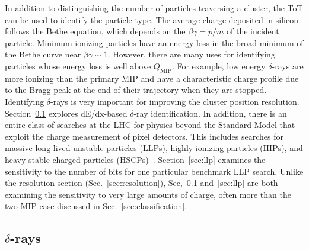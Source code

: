 \documentclass[12pt]{article}
\begin{document}
In addition to distinguishing the number of particles traversing a cluster, the ToT can be used to identify the particle type.  The average charge deposited in silicon follows the Bethe equation, which depends on the $\beta\gamma=p/m$ of the incident particle.  Minimum ionizing particles have an energy loss in the broad minimum of the Bethe curve near $\beta\gamma\sim 1$.  However, there are many uses for identifying particles whose energy loss is well above $Q_\text{MIP}$.  For example, low energy $\delta$-rays are more ionizing than the primary MIP and have a characteristic charge profile due to the Bragg peak at the end of their trajectory when they are stopped.    Identifying $\delta$-rays is very important for improving the cluster position resolution.  Section~\ref{sec:deltas} explores dE/dx-based $\delta$-ray identification.  In addition, there is an entire class of searches at the LHC for physics beyond the Standard Model that exploit the charge measurement of pixel detectors.  This includes searches for massive long lived unstable particles (LLPs), highly ionizing particles (HIPs), and heavy stable charged particles (HSCPs)~\cite{Aaboud:2016dgf,Khachatryan:2016sfv,ATLAS:2014fka,Chatrchyan:2013oca,Aad:2011yf,Aad:2012pra,Aad:2013pqd,Chatrchyan:2012sp,Khachatryan:2011ts}.  Section~\ref{sec:llp} examines the sensitivity to the number of bits for one particular benchmark LLP search.  Unlike the resolution section (Sec.~\ref{sec:resolution}), Sec,~\ref{sec:deltas} and~\ref{sec:llp} are both examining the sensitivity to very large amounts of charge, often more than the two MIP case discussed in Sec.~\ref{sec:classification}.

\subsection{$\delta$-rays}
\label{sec:deltas}
\end{document}
